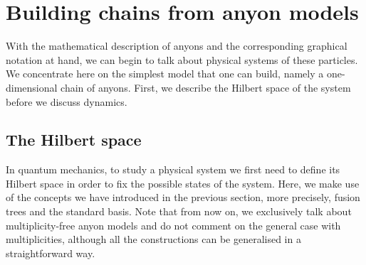 \section{Building chains from anyon models}

With the mathematical description of anyons and the corresponding graphical notation at hand, we can begin to talk about physical systems of these particles. We concentrate here on the simplest model that one can build, namely a one-dimensional chain of anyons. First, we describe the Hilbert space of the system before we discuss dynamics.

\subsection*{The Hilbert space}

In quantum mechanics, to study a physical system we first need to define its Hilbert space in order to fix the possible states of the system. Here, we make use of the concepts we have introduced in the previous section, more precisely, fusion trees and the standard basis. Note that from now on, we exclusively talk about multiplicity-free anyon models and do not comment on the general case with multiplicities, although all the constructions can be generalised in a straightforward way.

